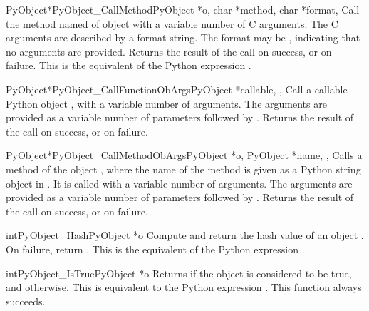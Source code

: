 \begin{cfuncdesc}{PyObject*}{PyObject_CallMethod}{PyObject *o,
                                                  char *method, char *format,
                                                  \moreargs}
  Call the method named  of object  with a variable
  number of C arguments.  The C arguments are described by a
   format string.  The format may be \NULL,
  indicating that no arguments are provided. Returns the result of the
  call on success, or \NULL{} on failure.  This is the equivalent of
  the Python expression .
\end{cfuncdesc}


\begin{cfuncdesc}{PyObject*}{PyObject_CallFunctionObArgs}{PyObject *callable,
                                                          \moreargs,
                                                          }
  Call a callable Python object , with a variable
  number of  arguments.  The arguments are provided
  as a variable number of parameters followed by \NULL.
  Returns the result of the call on success, or \NULL{} on failure.
\end{cfuncdesc}


\begin{cfuncdesc}{PyObject*}{PyObject_CallMethodObArgs}{PyObject *o,
                                                        PyObject *name,
                                                        \moreargs,
                                                        }
  Calls a method of the object , where the name of the method
  is given as a Python string object in .  It is called with
  a variable number of  arguments.  The arguments are
  provided as a variable number of parameters followed by \NULL.
  Returns the result of the call on success, or \NULL{} on failure.
\end{cfuncdesc}


\begin{cfuncdesc}{int}{PyObject_Hash}{PyObject *o}
  Compute and return the hash value of an object .  On failure,
  return .  This is the equivalent of the Python expression
  .
\end{cfuncdesc}


\begin{cfuncdesc}{int}{PyObject_IsTrue}{PyObject *o}
  Returns  if the object  is considered to be true, and
   otherwise.  This is equivalent to the Python expression
  .  This function always succeeds.
\end{cfuncdesc}


